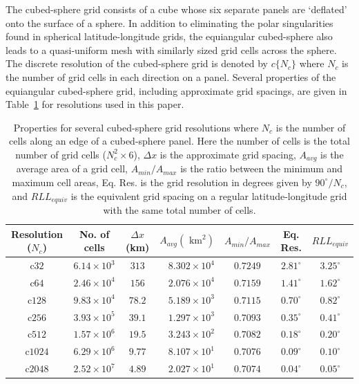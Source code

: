   The cubed-sphere grid consists of a cube whose six separate panels are `deflated' onto the surface of a sphere. In addition to eliminating the polar singularities found in spherical latitude-longitude grids, the equiangular cubed-sphere also leads to a quasi-uniform mesh with similarly sized grid cells across the sphere. The discrete resolution of the cubed-sphere grid is denoted by $c\{N_c\}$ where $N_c$ is the number of grid cells in each direction on a panel. Several properties of the equiangular cubed-sphere grid, including approximate grid spacings, are given in Table~\ref{tb:grids} for resolutions used in this paper. 

\begin{table}[t]
    \caption{Properties for several cubed-sphere grid resolutions where 
    $N_c$ is the number of cells along an edge of a cubed-sphere panel.
    Here the number of cells is the total number of grid cells 
    ($N_c^2 \times 6$), $\Delta x$ is the approximate grid spacing, 
    $A_{avg}$ is the average area of a grid cell, $A_{min}/A_{max}$ is the
    ratio between the minimum and maximum cell areas, Eq.  Res.  is the
    grid resolution in degrees given by $90^\circ / N_c$, and $RLL_{equiv}$
    is the equivalent grid spacing on a regular latitude-longitude
    grid with the same total number of cells.}%
    \label{tb:grids}
    \begin{center}
    \begin{tabular}{cccrccc}
            \hline
            Resolution ($N_c$) & No. of cells       & $\Delta x$ (km) & $A_{avg} (\mbox{ km}^2)$ & $A_{min}/A_{max}$ & Eq. Res.     & $RLL_{equiv}$ \\ 
            \hline
            \hline
            c$32$              & $6.14 \times 10^3$ & $313$           & $8.302 \times 10^{4}$    & $0.7249$          & $2.81^\circ$ & $3.25^\circ$  \\ 
            c$64$              & $2.46 \times 10^4$ & $156$           & $2.076 \times 10^{4}$    & $0.7159$          & $1.41^\circ$ & $1.62^\circ$  \\ 
            c$128$             & $9.83 \times 10^4$ & $78.2$          & $5.189 \times 10^{3}$    & $0.7115$          & $0.70^\circ$ & $0.82^\circ$  \\ 
            c$256$             & $3.93 \times 10^5$ & $39.1$          & $1.297 \times 10^{3}$    & $0.7093$          & $0.35^\circ$ & $0.41^\circ$  \\ 
            c$512$             & $1.57 \times 10^6$ & $19.5$          & $3.243 \times 10^{2}$    & $0.7082$          & $0.18^\circ$ & $0.20^\circ$  \\ 
            c$1024$           & $6.29 \times 10^6$ & $9.77$          & $8.107 \times 10^{1}$    & $0.7076$          & $0.09^\circ$ & $0.10^\circ$  \\ 
            c$2048$           & $2.52 \times 10^7$ & $4.89$          & $2.027 \times 10^{1}$   & $0.7074$          & $0.04^\circ$ & $0.05^\circ$ \\
            \hline
        \end{tabular}
    \end{center}
\end{table}
  
